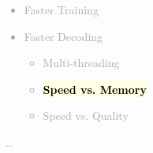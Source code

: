 \documentclass[landscape]{uedslides2C}
\newcommand{\currenttopic}[1]{\colorbox{lightyellow}{\textcolor{black}{\bf #1}}}
\begin{document}
\vspace{-5mm}
\textcolor{darkgrey}{
\begin{itemize} \itemsep -1mm
\item {Faster Training}
\item {Faster Decoding}
  \begin{itemize}
  \item {Multi-threading}
  \item \currenttopic{Speed vs. Memory}
  \item Speed vs. Quality
  \end{itemize}
\end{itemize}
\ldots
}



\end{document}
